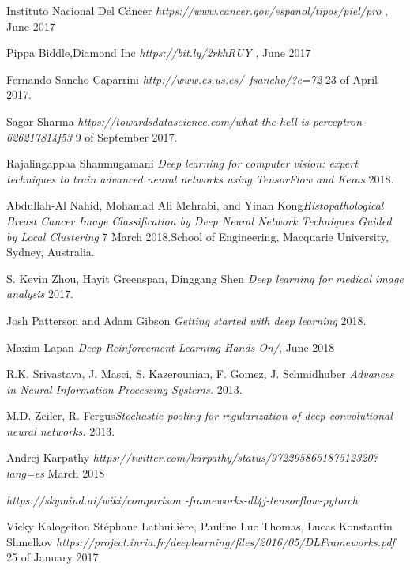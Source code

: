 \documentclass[titlepage,openright,twoside,a4paper,
final,12pt,english]{book}
\begin{document}
\begin{thebibliography}{9}

 Instituto Nacional Del Cáncer {\em https://www.cancer.gov/espanol/tipos/piel/pro }, June 2017


 Pippa Biddle,Diamond Inc {\em https://bit.ly/2rkhRUY }, June 2017

   Fernando Sancho Caparrini {\em http://www.cs.us.es/~fsancho/?e=72}  23 of April 2017.

   Sagar Sharma {\em https://towardsdatascience.com/what-the-hell-is-perceptron-626217814f53} 9 of September 2017.

   Rajalingappaa Shanmugamani {\em Deep learning for computer vision: expert techniques to train advanced neural networks using TensorFlow and Keras} 2018.

   Abdullah-Al Nahid, Mohamad Ali Mehrabi, and Yinan Kong{\em Histopathological Breast Cancer Image Classification by Deep Neural Network Techniques Guided by Local Clustering} 7 March 2018.School of Engineering, Macquarie University, Sydney, Australia.

   S. Kevin Zhou, Hayit Greenspan, Dinggang Shen
{\em Deep learning for medical image analysis} 2017.

   Josh Patterson and Adam Gibson
{\em Getting started with deep learning } 2018.

 Maxim Lapan {\em Deep Reinforcement Learning Hands-On/}, June 2018

   R.K. Srivastava, J. Masci, S. Kazerounian, F. Gomez, J. Schmidhuber {\em Advances in Neural Information Processing Systems. } 2013.

   M.D. Zeiler, R. Fergus{\em Stochastic pooling for regularization of deep convolutional neural networks. } 2013.

   Andrej Karpathy {\em 
https://twitter.com/karpathy/status/972295865187512320?lang=es} March 2018

   {\em https://skymind.ai/wiki/comparison -frameworks-dl4j-tensorflow-pytorch}

   Vicky Kalogeiton Stéphane
Lathuilière, Pauline Luc Thomas, Lucas Konstantin Shmelkov
{\em https://project.inria.fr/deeplearning/files/2016/05/DLFrameworks.pdf} 25 of January 2017


\end{thebibliography}
\end{document}
